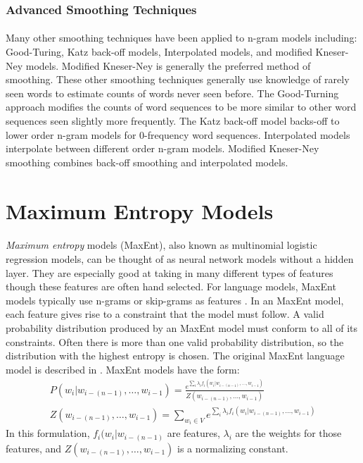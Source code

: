 \documentclass[12pt]{ociamthesis}
\begin{document}
\subsubsection{Advanced Smoothing Techniques}
\paragraph{}
Many other smoothing techniques have been applied to n-gram models including: Good-Turing, Katz back-off models, Interpolated models, and modified Kneser-Ney models. Modified Kneser-Ney is generally the preferred method of smoothing. These other smoothing techniques generally use knowledge of rarely seen words to estimate counts of words never seen before. The Good-Turning approach modifies the counts of word sequences to be more similar to other word sequences seen slightly more frequently. The Katz back-off model backs-off to lower order n-gram models for 0-frequency word sequences. Interpolated models interpolate between different order n-gram models. Modified Kneser-Ney smoothing combines back-off smoothing and interpolated models.

\section{Maximum Entropy  Models}
\paragraph{}
\emph{Maximum entropy} models (MaxEnt), also known as multinomial logistic regression models, can be thought of as neural network models without a hidden layer. They are especially good at taking in many different types of features though these features are often hand selected. For language models, MaxEnt models typically use n-grams or skip-grams as features \cite{Mikolav2012}. In an MaxEnt model, each feature gives rise to a constraint that the model must follow. A valid probability distribution produced by an MaxEnt model must conform to all of its constraints. Often there is more than one valid probability distribution, so the distribution with the highest entropy is chosen. The original MaxEnt language model is described in \cite{Rosenfeld1994}.
MaxEnt models have the form:
\begin{align}
P(w_i | w_{i-(n-1)},\dots, w_{i-1}) = \frac{e^{\sum_i \lambda_i f_i(w_i | w_{i-(n-1)},\dots, w_{i-1})}}{Z(w_{i-(n-1)},
\dots, w_{i-1})}
\\Z(w_{i-(n-1)},\dots, w_{i-1}) = \sum_{w_i \in V} e^{\sum_i \lambda_i f_i(w_i | w_{i-(n-1)},\dots, w_{i-1})}
\end{align}
In this formulation, $f_i(w_i | w_{i-(n-1)}$ are features, $\lambda_i$ are the weights for those features, and $Z(w_{i-(n-1)},\dots, w_{i-1})$ is a normalizing constant.
\end{document}
